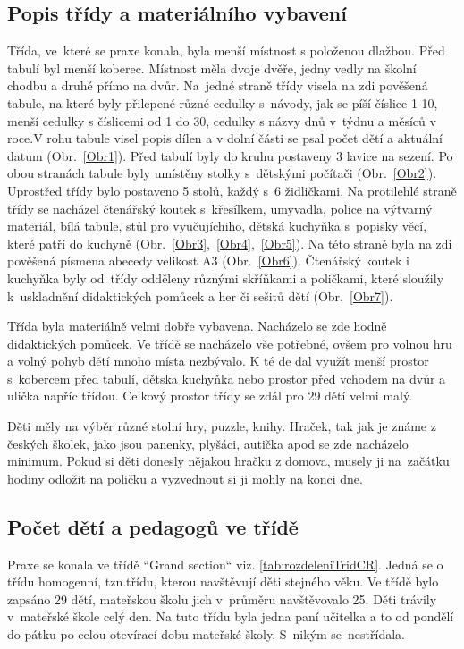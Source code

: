 		\subsection{Popis třídy a materiálního vybavení}
		\label{tridaVybaveni}
			Třída, ve které se praxe konala, byla menší místnost s položenou dlažbou. Před tabulí byl menší koberec. Místnost měla dvoje dvěře, jedny vedly na školní chodbu a druhé přímo na dvůr.
			Na jedné straně třídy visela na zdi pověšená tabule, na které byly přilepené různé cedulky s návody, jak se píší číslice 1-10, menší cedulky s číslicemi od 1 do 30, cedulky s názvy dnů v týdnu a měsíců v roce.V rohu tabule visel popis dílen a v dolní části se psal počet dětí a aktuální datum (Obr.~\ref{Obr1}). Před tabulí byly do kruhu postaveny 3 lavice na sezení. Po obou stranách tabule byly umístěny stolky s dětskými počítači (Obr.~\ref{Obr2}). Uprostřed třídy bylo postaveno 5 stolů, každý s 6 židličkami. Na protilehlé straně třídy se nacházel čtenářský koutek s křesílkem, umyvadla, police na výtvarný materiál, bílá tabule, stůl pro vyučujíchiho, dětská kuchyňka s popisky věcí, které patří do kuchyně (Obr.~\ref{Obr3},~\ref{Obr4},~\ref{Obr5}). Na této straně byla na zdi pověšená písmena abecedy velikost A3 (Obr.~\ref{Obr6}). Čtenářský koutek i kuchyňka byly od třídy odděleny různými skříňkami a poličkami, které sloužily k uskladnění didaktických pomůcek a her či sešitů dětí (Obr.~\ref{Obr7}).

			Třída byla materiálně velmi dobře vybavena. Nacházelo se zde hodně didaktických pomůcek. Ve třídě se nacházelo vše potřebné, ovšem pro volnou hru a volný pohyb dětí mnoho místa nezbývalo. K té de dal využít menší prostor s kobercem před tabulí, dětska kuchyňka nebo prostor před vchodem na dvůr a ulička napříc třídou. Celkový prostor třídy se zdál pro 29 dětí velmi malý.

			Děti měly na výběr různé stolní hry, puzzle, knihy. Hraček, tak jak je známe z českých školek, jako jsou panenky, plyšáci, autička apod se zde nacházelo minimum. Pokud si děti donesly nějakou hračku z domova, musely ji na začátku hodiny odložit na poličku a vyzvednout si ji mohly na konci dne. 

		\subsection{Počet dětí a pedagogů ve třídě}
		\label{trida}

			Praxe se konala ve třídě “Grand section“ viz. \ref{tab:rozdeleniTridCR}. Jedná se o třídu homogenní, tzn.třídu, kterou navštěvují děti stejného věku. Ve třídě bylo zapsáno 29 dětí, mateřskou školu jich v průměru navštěvovalo 25. Děti trávily v mateřské škole celý den. Na tuto třídu byla jedna paní učitelka a to od pondělí do pátku po celou otevírací dobu mateřské školy. S nikým se nestřídala. 

